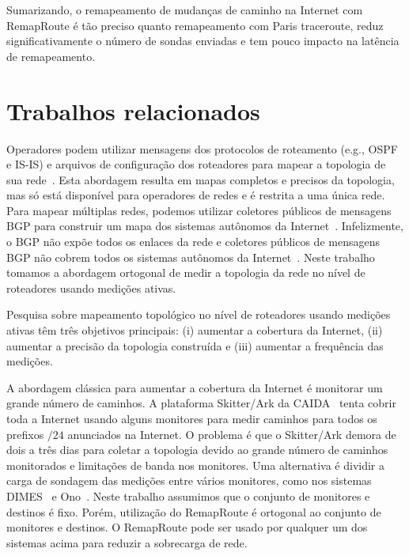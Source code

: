 \documentclass{JBCS}
\newcommand{\rmprt}{{Re\-map\-Rou\-te}}
\begin{document}
Sumarizando, o remapeamento de mudanças de caminho na Internet com
\rmprt{} é tão preciso quanto remapeamento com Paris traceroute, reduz
significativamente o número de sondas enviadas e tem pouco impacto na
latência de remapeamento.

\section{Trabalhos relacionados}
\label{sec:related}

Operadores podem utilizar mensagens dos protocolos de roteamento (e.g.,
OSPF e IS-IS) e arquivos de configuração dos roteadores para mapear a
topologia de sua rede~\cite{feamster05nsdi, turner10cenic,
athina08link}.  Esta abordagem resulta em mapas completos e precisos da
topologia, mas só está disponível para operadores de redes e é restrita
a uma única rede.  Para mapear múltiplas redes, podemos utilizar
coletores públicos de mensagens BGP\footnotemark{} para construir um
mapa dos sistemas autônomos da Internet~\cite{oliveira08as2tier,
dhamdhere08evo}.  Infelizmente, o BGP não expõe todos os enlaces da rede
e coletores públicos de mensagens BGP não cobrem todos os sistemas
autônomos da Internet~\cite{oliveira08as2tier, cohen06darkmatter}.
Neste trabalho tomamos a abordagem ortogonal de medir a topologia da
rede no nível de roteadores usando medições ativas.


Pesquisa sobre mapeamento topológico no nível de roteadores usando
medições ativas têm três objetivos principais: (i) aumentar a cobertura
da Internet, (ii) aumentar a precisão da topologia construída e (iii)
aumentar a frequência das medições.

A abordagem clássica para aumentar a cobertura da Internet é monitorar
um grande número de caminhos.  A plataforma Skitter/Ark da
CAIDA~\cite{skitter} tenta cobrir toda a Internet usando alguns
monitores para medir caminhos para todos os prefixos $/24$ anunciados na
Internet.  O problema é que o Skitter/Ark demora de dois a três dias
para coletar a topologia devido ao grande número de caminhos monitorados
e limitações de banda nos monitores.  Uma alternativa é dividir a carga
de sondagem das medições entre vários monitores, como nos sistemas
DIMES~\cite{shavitt09dimes} e Ono~\cite{choffnes10crowd}.  Neste
trabalho assumimos que o conjunto de monitores e destinos é fixo.
Porém, utilização do RemapRoute é ortogonal ao conjunto de monitores e
destinos.  O RemapRoute pode ser usado por qualquer um dos sistemas
acima para reduzir a sobrecarga de rede.
\end{document}
